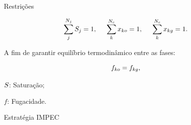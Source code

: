\documentclass[professionalfont]{beamer}
\begin{document}
\begin{frame}{Restrições}

    \begin{equation}
        \label{eq:modelo_mat.9}
        \sum_{j}^{N_{j}} S_{j} = 1, \hspace{0.5cm} \sum_{k}^{N_{c}} x_{k o} = 1, \hspace{0.5cm} \sum_{k}^{N_{c}} x_{k g} = 1.
    \end{equation}

    A fim de garantir equilíbrio termodinâmico entre as fases:

    \begin{equation}
        \label{eq:modelo_mat.8}
        f_{k o} = f_{k g},
    \end{equation}

    \begin{description}
        \item $S$: Saturação;
        \item $f$: Fugacidade.
    \end{description}
    
\end{frame}

    


\begin{frame}{Estratégia IMPEC}
    \centering
        \resizebox*{4cm}{!}{
        }
\end{frame}


    
\end{document}

